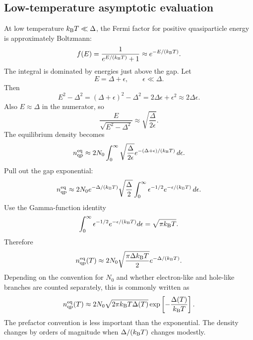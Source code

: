 \documentclass[11pt]{article}
\newcommand{\eq}{\mathrm{eq}}
\begin{document}
\subsection{Low-temperature asymptotic evaluation}
At low temperature $k_{\mathrm{B}} T\ll\Delta$, the Fermi factor for positive quasiparticle energy is approximately Boltzmann:
\begin{equation}
 f(E)=\frac{1}{e^{E/(k_{\mathrm{B}} T)}+1}\approx e^{-E/(k_{\mathrm{B}} T)}.
\end{equation}
The integral is dominated by energies just above the gap. Let
\begin{equation}
E=\Delta+\epsilon,\qquad \epsilon\ll\Delta.
\end{equation}
Then
\begin{equation}
E^2-\Delta^2=(\Delta+\epsilon)^2-\Delta^2=2\Delta\epsilon+\epsilon^2\approx2\Delta\epsilon.
\end{equation}
Also $E\approx\Delta$ in the numerator, so
\begin{equation}
\frac{E}{\sqrt{E^2-\Delta^2}}\approx\sqrt{\frac{\Delta}{2\epsilon}}.
\end{equation}
The equilibrium density becomes
\begin{equation}
 n_{\qp}^{\eq}\approx 2N_0\int_0^{\infty}\sqrt{\frac{\Delta}{2\epsilon}}
 e^{-(\Delta+\epsilon)/(\kB T)}\,d\epsilon.
\end{equation}
Pull out the gap exponential:
\begin{equation}
 n_{\qp}^{\eq}\approx2N_0e^{-\Delta/(\kB T)}\sqrt{\frac{\Delta}{2}}
 \int_0^{\infty}\epsilon^{-1/2}e^{-\epsilon/(\kB T)}\,d\epsilon.
\end{equation}
Use the Gamma-function identity
\begin{equation}
\int_0^{\infty}\epsilon^{-1/2}e^{-\epsilon/(k_{\mathrm{B}} T)}d\epsilon
=\sqrt{\pi k_{\mathrm{B}} T}.
\end{equation}
Therefore
\begin{equation}
 n_{\qp}^{\eq}(T)\approx 2N_0\sqrt{\frac{\pi\Delta\kB T}{2}}e^{-\Delta/(\kB T)}.
\end{equation}
Depending on the convention for $N_0$ and whether electron-like and hole-like branches are counted separately, this is commonly written as
\begin{equation}
 n_{\qp}^{\eq}(T)\approx 2N_0\sqrt{2\pi\kB T\Delta(T)}\exp\left[-\frac{\Delta(T)}{\kB T}\right].
\label{eq:neq_final}
\end{equation}
The prefactor convention is less important than the exponential. The density changes by orders of magnitude when $\Delta/(k_{\mathrm{B}} T)$ changes modestly.
\end{document}
